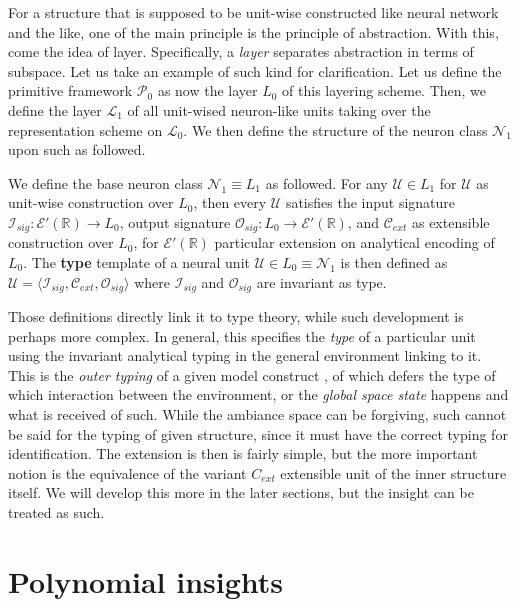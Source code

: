 For a structure that is supposed to be unit-wise constructed like neural network and the like, one of the main principle is the principle of abstraction. With this, come the idea of layer. Specifically, a \textit{layer} separates abstraction in terms of subspace. Let us take an example of such kind for clarification. Let us define the primitive framework $\mathcal{P}_{0}$ as now the layer $L_{0}$ of this layering scheme. Then, we define the layer $\mathcal{L}_{1}$ of all unit-wised neuron-like units taking over the representation scheme on $\mathcal{L}_{0}$. We then define the structure of the neuron class $\mathcal{N}_{1}$ upon such as followed. 

\begin{definition}
    We define the base neuron class $\mathcal{N}_{1}\equiv L_{1}$ as followed. For any $\mathcal{U}\in L_{1}$ for $\mathcal{U}$ as unit-wise construction over $L_{0}$, then every $\mathcal{U}$ satisfies the input signature $\mathcal{I}_{sig}:\mathcal{E}'(\mathbb{R})\to L_{0}$, output signature $\mathcal{O}_{sig}:L_{0}\to\mathcal{E}'(\mathbb{R})$, and $\mathcal{C}_{ext}$ as extensible construction over $L_{0}$, for $\mathcal{E}'(\mathbb{R})$ particular extension on analytical encoding of $L_{0}$. The \textbf{type} template of a neural unit $\mathcal{U}\in L_{0}\equiv \mathcal{N}_{1}$ is then defined as $\mathcal{U}=\langle \mathcal{I}_{sig},\mathcal{C}_{ext},\mathcal{O}_{sig}\rangle$ where $\mathcal{I}_{sig}$ and $\mathcal{O}_{sig}$ are invariant as type. 
\end{definition}

Those definitions directly link it to type theory, while such development is perhaps more complex. In general, this specifies the \textit{type} of a particular unit using the invariant analytical typing in the general environment linking to it. This is the \textit{outer typing} of a given model construct , of which defers the type of which interaction between the environment, or the \textit{global space state} happens and what is received of such. While the ambiance space can be forgiving, such cannot be said for the typing of given structure, since it must have the correct typing for identification. The extension is then is fairly simple, but the more important notion is the equivalence of the variant $C_{ext}$ extensible unit of the inner structure itself. We will develop this more in the later sections, but the insight can be treated as such. 

\section{Polynomial insights}

